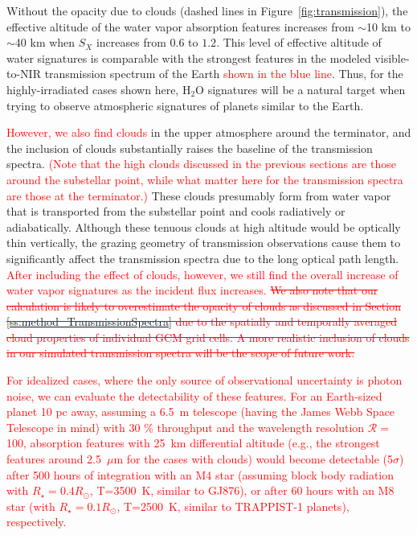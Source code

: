 \documentclass[11pt,numberedappendix,twocolappendix,]{emulateapj}
\def\water{H$_2$O}
\def\addYF#1{\textcolor{red}{#1}}
\def\changeYF#1#2{\textcolor{red}{\sout{#1} #2}}
\begin{document}
Without the opacity due to clouds (dashed lines in Figure~\ref{fig:transmission}), the effective altitude of the water vapor absorption features increases from $\sim $10 km to $\sim $40 km when $S_X$ increases from $0.6$ to $1.2$. 
This level of effective altitude of water signatures is comparable with the strongest features in the modeled visible-to-NIR transmission spectrum of the Earth \addYF{shown in the blue line}. %
Thus, for the highly-irradiated cases shown here, \water{} signatures will be a natural target when trying to observe atmospheric signatures of planets similar to the Earth. 

\addYF{However, we also find clouds} 
in the upper atmosphere around the terminator, and the inclusion of clouds substantially raises the baseline of the transmission spectra. 
\addYF{(Note that the high clouds discussed in the previous sections are those around the substellar point, while what matter here for the transmission spectra are those at the terminator.)} 
These clouds presumably form from water vapor that is transported from the substellar point and cools radiatively or adiabatically. 
Although these tenuous clouds at high altitude would be optically thin vertically, the grazing geometry of transmission observations cause them to significantly affect the transmission spectra due to the long optical path length. 
\addYF{After including the effect of clouds, however, we still find the overall increase of water vapor signatures as the incident flux increases. }
\changeYF{We also note that our calculation is likely to overestimate the opacity of clouds as discussed in Section \ref{ss:method_TransmissionSpectra} due to the spatially and temporally averaged cloud properties of individual GCM grid cells. %
A more realistic inclusion of clouds in our simulated transmission spectra will be the scope of future work. }{}

\addYF{%
For idealized cases, where the only source of observational uncertainty is photon noise, we can evaluate the detectability of these features. For an Earth-sized planet 10 pc away, assuming a 6.5~m telescope (having the James Webb Space Telescope in mind) with 30 \% throughput and the wavelength resolution $\mathcal{R}=$100, absorption features with 25~km differential altitude (e.g., the strongest features around 2.5~$\mu$m for the cases with clouds) would become detectable (5$\sigma $) after 500 hours of integration with an M4 star (assuming block body radiation with $R_{\star }=0.4 R_{\odot }$, T=3500~K, similar to GJ876), or after 60 hours with an M8 star (with $R_{\star }=0.1 R_{\odot }$, T=2500~K, similar to TRAPPIST-1 planets), respectively. }
\end{document}
